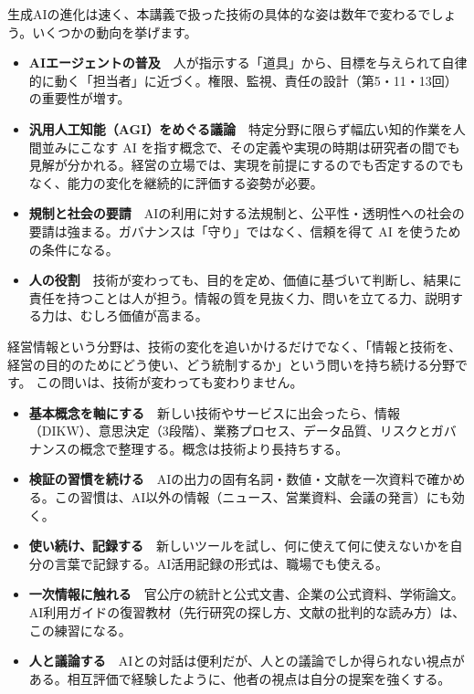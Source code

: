 生成AIの進化は速く、本講義で扱った技術の具体的な姿は数年で変わるでしょう。いくつかの動向を挙げます。
\begin{itemize}
  \item \textbf{AIエージェントの普及}　人が指示する「道具」から、目標を与えられて自律的に動く「担当者」に近づく。権限、監視、責任の設計（第5・11・13回）の重要性が増す。
  \item \textbf{汎用人工知能（AGI）をめぐる議論}　特定分野に限らず幅広い知的作業を人間並みにこなす AI を指す概念で、その定義や実現の時期は研究者の間でも見解が分かれる。経営の立場では、実現を前提にするのでも否定するのでもなく、能力の変化を継続的に評価する姿勢が必要。
  \item \textbf{規制と社会の要請}　AIの利用に対する法規制と、公平性・透明性への社会の要請は強まる。ガバナンスは「守り」ではなく、信頼を得て AI を使うための条件になる。
  \item \textbf{人の役割}　技術が変わっても、目的を定め、価値に基づいて判断し、結果に責任を持つことは人が担う。情報の質を見抜く力、問いを立てる力、説明する力は、むしろ価値が高まる。
\end{itemize}
経営情報という分野は、技術の変化を追いかけるだけでなく、「情報と技術を、経営の目的のためにどう使い、どう統制するか」という問いを持ち続ける分野です。
この問いは、技術が変わっても変わりません。

\begin{itemize}
  \item \textbf{基本概念を軸にする}　新しい技術やサービスに出会ったら、情報（DIKW）、意思決定（3段階）、業務プロセス、データ品質、リスクとガバナンスの概念で整理する。概念は技術より長持ちする。
  \item \textbf{検証の習慣を続ける}　AIの出力の固有名詞・数値・文献を一次資料で確かめる。この習慣は、AI以外の情報（ニュース、営業資料、会議の発言）にも効く。
  \item \textbf{使い続け、記録する}　新しいツールを試し、何に使えて何に使えないかを自分の言葉で記録する。AI活用記録の形式は、職場でも使える。
  \item \textbf{一次情報に触れる}　官公庁の統計と公式文書、企業の公式資料、学術論文。AI利用ガイドの復習教材（先行研究の探し方、文献の批判的な読み方）は、この練習になる。
  \item \textbf{人と議論する}　AIとの対話は便利だが、人との議論でしか得られない視点がある。相互評価で経験したように、他者の視点は自分の提案を強くする。
\end{itemize}


